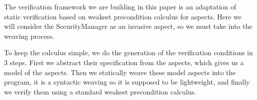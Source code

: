 The verification framework we are building in this paper is an adaptation of
static 
verification based on weakest precondition calculus for aspects. Here we will
consider 
the SecurityManager as an invasive aspect, so we must take into the weaving
process. 

To keep the calculus simple, we do the generation of the verification
conditions in 3 steps. 
First we abstract their specification from the aspects, which gives us a model
of the aspects. 
Then we statically weave these model aspects into the program, it is a
syntactic weaving so 
it is supposed to be lightweight, and finally we verify them
using a standard weakest precondition calculus.